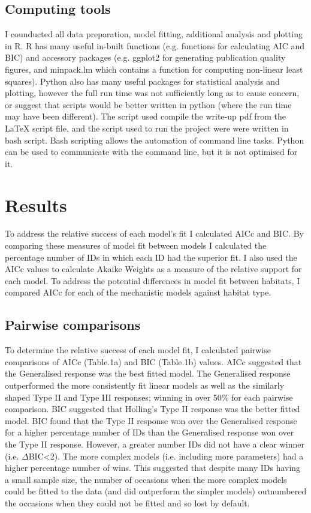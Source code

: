 \documentclass[11pt]{article}
\begin{document}
        \subsection{Computing tools}
            I counducted all data preparation, model fitting, additional analysis and plotting in R. R has many useful in-built functions (e.g. functions for calculating AIC and BIC) and accessory packages (e.g. ggplot2 for generating publication quality figures, and minpack.lm which contains a function for computing non-linear least squares). Python also has many useful packages for statistical analysis and plotting, however the full run time was not sufficiently long as to cause concern, or suggest that scripts would be better written in python (where the run time may have been different). The script used compile the write-up pdf from the LaTeX script file, and the script used to run the project were were written in bash script. Bash scripting allows the automation of command line tasks. Python can be used to communicate with the command line, but it is not optimised for it.
        
    \section{Results} %
        
        To address the relative success of each model's fit I calculated AICc and BIC. By comparing these measures of model fit between models I calculated the percentage number of IDs in which each ID had the superior fit. I also used the AICc values to calculate Akaike Weights as a measure of the relative support for each model. To address the potential differences in model fit between habitats, I compared AICc for each of the mechanistic models against habitat type.

        \subsection{Pairwise comparisons}
            To determine the relative success of each model fit, I calculated pairwise comparisons of AICc (Table.1a) and BIC (Table.1b) values. AICc suggested that the Generalised response was the best fitted model. The Generalised response outperformed the more consistently fit linear models as well as the similarly shaped Type II and Type III responses; winning in over 50\% for each pairwise comparison. BIC suggested that Holling's Type II response was the better fitted model. BIC found that the Type II response won over the Generalised response for a higher percentage number of IDs than the Generalised response won over the Type II response. However, a greater number IDs did not have a clear winner (i.e. $\Delta$BIC\textless2). The more complex models (i.e. including more parameters) had a higher percentage number of wins. This suggested that despite many IDs having a small sample size, the number of occasions when the more complex models could be fitted to the data (and did outperform the simpler models) outnumbered the occasions when they could not be fitted and so lost by default.
            
\end{document}
